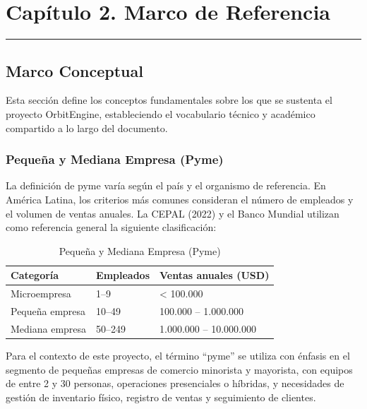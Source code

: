 \chapter{Capítulo 2. Marco de Referencia}\label{capuxedtulo-2.-marco-de-referencia}

\begin{center}\rule{0.5\linewidth}{0.5pt}\end{center}

\section{Marco Conceptual}\label{marco-conceptual}

Esta sección define los conceptos fundamentales sobre los que se sustenta el proyecto OrbitEngine, estableciendo el vocabulario técnico y académico compartido a lo largo del documento.

\subsection{Pequeña y Mediana Empresa (Pyme)}\label{pequeuxf1a-y-mediana-empresa-pyme}

La definición de pyme varía según el país y el organismo de referencia. En América Latina, los criterios más comunes consideran el número de empleados y el volumen de ventas anuales. La CEPAL (2022) y el Banco Mundial utilizan como referencia general la siguiente clasificación:

\begin{longtable}[]{@{}lll@{}}
\caption[Pequeña y Mediana Empresa (Pyme)]{Pequeña y Mediana Empresa (Pyme)}\tabularnewline
\toprule\noalign{}
Categoría & Empleados & Ventas anuales (USD) \\
\midrule\noalign{}
\endhead
\bottomrule\noalign{}
\endlastfoot
Microempresa & 1--9 & \textless{} 100.000 \\
Pequeña empresa & 10--49 & 100.000 -- 1.000.000 \\
Mediana empresa & 50--249 & 1.000.000 -- 10.000.000 \\
\end{longtable}

Para el contexto de este proyecto, el término ``pyme'' se utiliza con énfasis en el segmento de pequeñas empresas de comercio minorista y mayorista, con equipos de entre 2 y 30 personas, operaciones presenciales o híbridas, y necesidades de gestión de inventario físico, registro de ventas y seguimiento de clientes.

